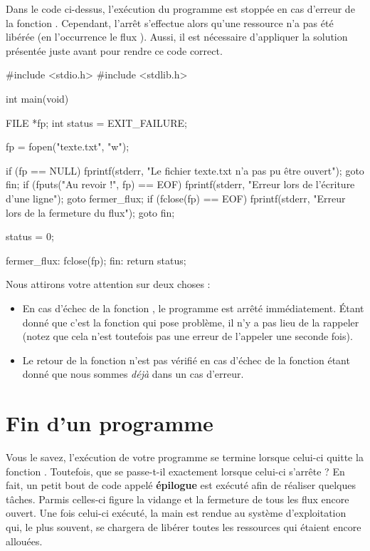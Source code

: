 Dans le code ci-dessus, l'exécution du programme est stoppée en cas
d'erreur de la fonction . Cependant, l'arrêt s'effectue
alors qu'une ressource n'a pas été libérée (en l'occurrence le flux
). Aussi, il est nécessaire d'appliquer la solution présentée
juste avant pour rendre ce code correct.

\begin{C}
#include <stdio.h>
#include <stdlib.h>


int main(void)
{
    FILE *fp;
    int status = EXIT_FAILURE;

    fp = fopen("texte.txt", "w");

    if (fp == NULL)
    {
        fprintf(stderr, "Le fichier texte.txt n'a pas pu être ouvert\n");
        goto fin;
    }
    if (fputs("Au revoir !\n", fp) == EOF)
    {
        fprintf(stderr, "Erreur lors de l'écriture d'une ligne\n");
        goto fermer_flux;
    }
    if (fclose(fp) == EOF)
    {
        fprintf(stderr, "Erreur lors de la fermeture du flux\n");
        goto fin;   
    }

    status = 0;

fermer_flux:
    fclose(fp);
fin:
    return status;
}
\end{C}

Nous attirons votre attention sur deux choses :

\begin{itemize}
\item
  En cas d'échec de la fonction , le programme est
  arrêté immédiatement. Étant donné que c'est la fonction
   qui pose problème, il n'y a pas lieu de la rappeler
  (notez que cela n'est toutefois pas une erreur de l'appeler une
  seconde fois).
\item
  Le retour de la fonction  n'est pas vérifié en cas
  d'échec de la fonction  étant donné que nous sommes
  \emph{déjà} dans un cas d'erreur.
\end{itemize}
  
\section{Fin d'un programme}
\label{fin-d-un-programme}
  
Vous le savez, l'exécution de votre programme se termine lorsque celui-ci 
quitte la fonction . Toutefois, que se passe-t-il exactement 
lorsque celui-ci s'arrête ? En fait, un petit bout de code appelé   
\textbf{épilogue} est exécuté afin de réaliser quelques tâches. Parmis
celles-ci figure la vidange et la fermeture de tous les flux encore
ouvert. Une fois celui-ci exécuté, la main est rendue au système
d'exploitation qui, le plus souvent, se chargera de libérer toutes les
ressources qui étaient encore allouées.


